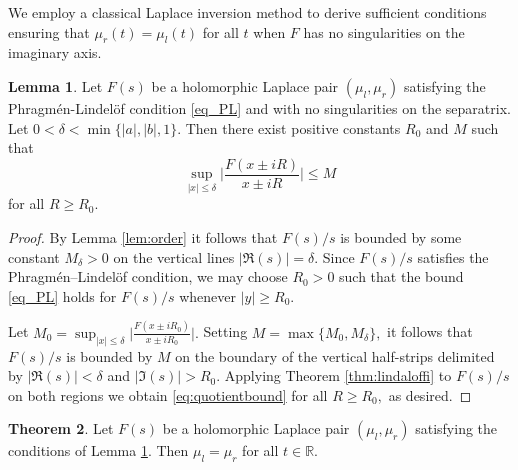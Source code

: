 \documentclass[12pt]{article}
\theoremstyle{definition}
\newtheorem{theorem}{Theorem}[section]
\newtheorem{lemma}[theorem]{Lemma}
\begin{document}
We employ a classical Laplace inversion method to derive sufficient conditions ensuring that \( \mu_r(t) = \mu_l(t) \) for all \( t \) when \( F \) has no singularities on the imaginary axis.

\begin{lemma}\label{lem:prehol}
     Let $F(s)$ be a holomorphic Laplace pair $(\mu_l,\mu_r)$ satisfying the Phragm\'{e}n-Lindel\"{o}f condition \eqref{eq_PL} and with no singularities on the separatrix. Let 
          $0<\delta<\min \{|a|, |b|, 1 \}.$ Then there exist positive constants $R_0$ and $M$ such that 
     \begin{equation}
         \label{eq:quotientbound}
              \sup_{|x| \leq \delta} \Bigg|\frac{F(x \pm iR)}{x \pm iR} \Bigg| \leq M    
     \end{equation}
                     for all $R \geq R_0$.
           \end{lemma}
               
          

\begin{proof}
   By Lemma \ref{lem:order} it follows that $F(s)/s$ is bounded by some constant $M_{\delta}>0$ on the vertical lines \( |\Re(s)|= \delta. \)
    Since \( F(s)/s\) satisfies the Phragmén--Lindelöf condition, 
    we may choose $R_0>0$ such that the bound \eqref{eq_PL} holds for \(F(s)/s\) whenever $|y| \geq R_0.$ 
    
    Let $\displaystyle{M_0=\sup_{|x| \leq \delta} \Bigg|\frac{F(x \pm iR_0)}{x \pm iR_0} \Bigg|.}$ 
Setting \(M= \max \{M_0, M_{\delta} \},\) it follows that \(F(s)/s\) is bounded by $M$ on the boundary of the vertical half-strips delimited by \(|\Re(s)|< \delta\) and \(|\Im(s)|>R_0\). Applying Theorem \ref{thm:lindaloffi} to \(F(s)/s\) on both regions we obtain \eqref{eq:quotientbound} for all $R \geq R_0,$ as desired.
    
    
    
\end{proof}


\begin{theorem}\label{thm:hol}
    Let $F(s)$ be a holomorphic Laplace pair $(\mu_l,\mu_r)$ satisfying the conditions of Lemma \ref{lem:prehol}.
    Then $\mu_l=\mu_r$ for all  $t \in \mathbb{R}.$
\end{theorem}
\end{document}
